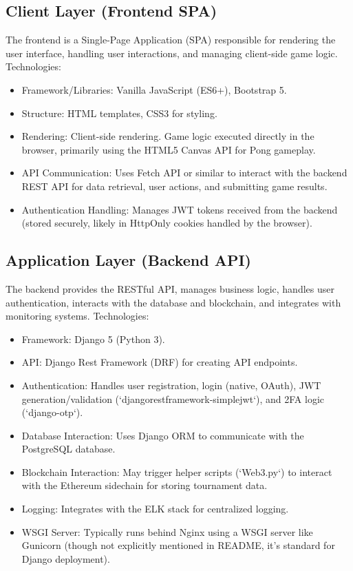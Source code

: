 \subsection*{Client Layer (Frontend SPA)}
The frontend is a Single-Page Application (SPA) responsible for rendering the user interface, handling user interactions, and managing client-side game logic. Technologies:
\begin{itemize}
    \item Framework/Libraries: Vanilla JavaScript (ES6+), Bootstrap 5.
    \item Structure: HTML templates, CSS3 for styling.
    \item Rendering: Client-side rendering. Game logic executed directly in the browser, primarily using the HTML5 Canvas API for Pong gameplay.
    \item API Communication: Uses Fetch API or similar to interact with the backend REST API for data retrieval, user actions, and submitting game results.
    \item Authentication Handling: Manages JWT tokens received from the backend (stored securely, likely in HttpOnly cookies handled by the browser).
\end{itemize}

\subsection*{Application Layer (Backend API)}
The backend provides the RESTful API, manages business logic, handles user authentication, interacts with the database and blockchain, and integrates with monitoring systems. Technologies:
\begin{itemize}
    \item Framework: Django 5 (Python 3).
    \item API: Django Rest Framework (DRF) for creating API endpoints.
    \item Authentication: Handles user registration, login (native, OAuth), JWT generation/validation (`djangorestframework-simplejwt`), and 2FA logic (`django-otp`).
    \item Database Interaction: Uses Django ORM to communicate with the PostgreSQL database.
    \item Blockchain Interaction: May trigger helper scripts (`Web3.py`) to interact with the Ethereum sidechain for storing tournament data.
    \item Logging: Integrates with the ELK stack for centralized logging.
    \item WSGI Server: Typically runs behind Nginx using a WSGI server like Gunicorn (though not explicitly mentioned in README, it's standard for Django deployment).
\end{itemize}

